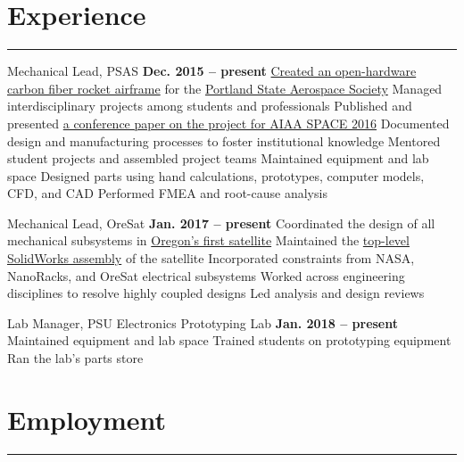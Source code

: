 \section{Experience}
\noindent\rule{\textwidth}{\hlinewidth}
	\begin{innerlist}
	\item Mechanical Lead, PSAS
		\hfill\textbf{Dec. 2015 -- present} %
		\subitem \href{https://github.com/psas/sw-cad-airframe-lv3.0}{Created 
			an open-hardware carbon fiber rocket airframe} for the 
			\href{http://psas.pdx.edu/}{Portland State Aerospace Society}
		\subitem Managed interdisciplinary projects among students and professionals
		\subitem Published and presented \href{http://arc.aiaa.org/doi/pdf/10.2514/6.2016-5365}{a conference paper on the project for AIAA SPACE 2016}
		\subitem Documented design and manufacturing processes to foster institutional knowledge
		\subitem Mentored student projects and assembled project teams
		\subitem Maintained equipment and lab space
		\subitem Designed parts using hand calculations, prototypes, computer models, CFD, and CAD
		\subitem Performed FMEA and root-cause analysis
	\item Mechanical Lead, OreSat 
		\hfill\textbf{Jan. 2017 -- present}
		\subitem Coordinated the design of all mechanical subsystems in \href{http://oresat.org/}{Oregon's first satellite}
		\subitem Maintained the \href{https://github.com/oresat/oresat-structure}{top-level SolidWorks assembly} of the satellite
		\subitem Incorporated constraints from NASA, NanoRacks, and OreSat electrical subsystems
		\subitem Worked across engineering disciplines to resolve highly coupled designs
		\subitem Led analysis and design reviews 
	\item Lab Manager, PSU Electronics Prototyping Lab
		\hfill\textbf{Jan. 2018 -- present}
		\subitem Maintained equipment and lab space
		\subitem Trained students on prototyping equipment
		\subitem Ran the lab's parts store
	\end{innerlist}
\vfill
\section{Employment}
\noindent\rule{\textwidth}{\hlinewidth}

